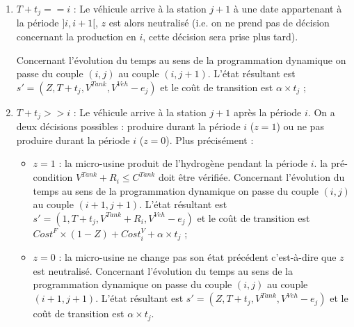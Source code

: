\begin{enumerate}
\begin{itemize}[label=$\square$]
	\end{itemize}
	
	\begin{enumerate}[label=\arabic*)]
		\item $T+t_j==i$ :
		Le véhicule arrive à la station $j+1$ à une date appartenant à la période $]i,i+1[$, $z$ est alors neutralisé (i.e. on ne prend pas de décision concernant la production en $i$, cette décision sera prise plus tard).
		
		Concernant l'évolution du temps au sens de la programmation dynamique on passe du couple $(i,j)$ au couple $(i,j+1)$. L'état résultant est $s' = (Z, T + t_j, V^{Tank}, V^{Veh} - e_j) $ et le coût de transition est $\alpha \times t_j$ ;
		
		\item $T+t_j>>i$ : Le véhicule arrive à la station $j+1$ après la période $i$.
		On a deux décisions possibles : produire durant la période $i$ ($z=1$) ou ne pas produire durant la période $i$ ($z=0$). Plus précisément :
		\begin{itemize}[label=$\square$]
			\item $z=1$ : la micro-usine produit de l'hydrogène pendant la période $i$. la pré-condition $V^{Tank} + R_i \leq C^{Tank}$ doit être vérifiée.
			Concernant l'évolution du temps au sens de la programmation dynamique on passe du couple $(i,j)$ au couple $(i+1,j+1)$. L'état résultant est $s'=(1, T+t_j,V^{Tank} + R_i, V^{Veh}-e_j)$ et le coût de transition est $Cost^F \times (1-Z) + Cost_i^V + \alpha \times t_j$ ;
			
			\item $z=0$ : 	la micro-usine ne change pas son état précédent c'est-à-dire que $z$ est neutralisé.
			Concernant l'évolution du temps au sens de la programmation dynamique on passe du couple $(i,j)$ au couple $(i+1,j+1)$. L'état résultant est $s' = (Z, T + t_j, V^{Tank}, V^{Veh} - e_j) $ et le coût de transition est $\alpha \times t_j$.
		\end{itemize}
	\end{enumerate}
\end{enumerate}



